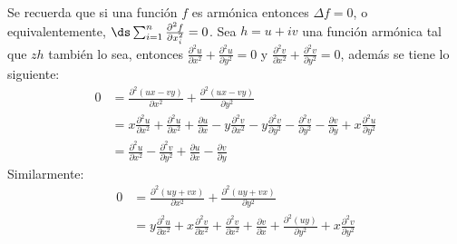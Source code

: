 \documentclass{homework}
\begin{document}
\begin{sol}
    Se recuerda que si una función \(f\) es armónica entonces \(\Delta f=0\), o equivalentemente, \(\ds\sum_{i=1}^n\frac{\partial^2f}{\partial x_i^2}=0\). Sea \(h=u+iv\) una función armónica tal que \(zh\) también lo sea, entonces \(\frac{\partial^2 u}{\partial x^2}+\frac{\partial^2 u}{\partial y^2}=0\) y \(\frac{\partial^2 v}{\partial x^2}+\frac{\partial^2 v}{\partial y^2}=0\), además se tiene lo siguiente:
    \begin{align*}
        0&=\frac{\partial^2 (ux-vy)}{\partial x^2}+\frac{\partial^2 (ux-vy)}{\partial y^2}\\
        &=x\frac{\partial^2 u}{\partial x^2}+\frac{\partial^2 u}{\partial x^2}+\frac{\partial u}{\partial x}-y\frac{\partial^2 v}{\partial x^2}-y\frac{\partial^2 v}{\partial y^2}-\frac{\partial^2 v}{\partial y^2}-\frac{\partial v}{\partial y}+x\frac{\partial^2 u}{\partial y^2}\\
        &=\frac{\partial^2 u}{\partial x^2}-\frac{\partial^2 v}{\partial y^2}+\frac{\partial u}{\partial x}-\frac{\partial v}{\partial y}
    \end{align*}
    Similarmente:
    \begin{align*}
        0&=\frac{\partial^2 (uy+vx)}{\partial x^2}+\frac{\partial^2 (uy+vx)}{\partial y^2}\\
        &=y\frac{\partial^2 u}{\partial x^2}+x\frac{\partial^2 v}{\partial x^2}+\frac{\partial^2 v}{\partial x^2}+\frac{\partial v}{\partial x}+\frac{\partial^2 (uy)}{\partial y^2}+x\frac{\partial^2 v}{\partial y^2}
    \end{align*}
\end{sol}
\end{document}
